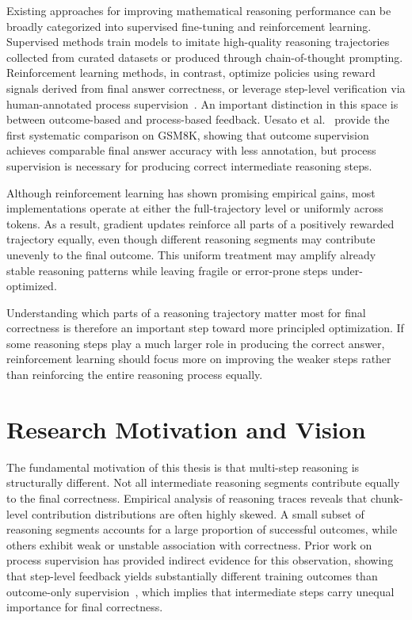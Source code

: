 \documentclass[12pt]{report}
\begin{document}
Existing approaches for improving mathematical reasoning performance can be broadly categorized into supervised fine-tuning and reinforcement learning. 
Supervised methods train models to imitate high-quality reasoning trajectories collected from curated datasets or produced through chain-of-thought prompting. 
Reinforcement learning methods, in contrast, optimize policies using reward signals derived from final answer correctness, or leverage step-level verification via human-annotated process supervision~\cite{lightman2023letsverifystepstep}.
An important distinction in this space is between outcome-based and process-based feedback. Uesato et al.~\cite{uesato2022solvingmathwordproblems} provide the first systematic comparison on GSM8K, showing that outcome supervision achieves comparable final answer accuracy with less annotation, but process supervision is necessary for producing correct intermediate reasoning steps.

Although reinforcement learning has shown promising empirical gains, most implementations operate at either the full-trajectory level or uniformly across tokens. 
As a result, gradient updates reinforce all parts of a positively rewarded trajectory equally, even though different reasoning segments may contribute unevenly to the final outcome. 
This uniform treatment may amplify already stable reasoning patterns while leaving fragile or error-prone steps under-optimized.

Understanding which parts of a reasoning trajectory matter most for final correctness is therefore an important step toward more principled optimization. 
If some reasoning steps play a much larger role in producing the correct answer, reinforcement learning should focus more on improving the weaker steps rather than reinforcing the entire reasoning process equally.

\section{Research Motivation and Vision}
The fundamental motivation of this thesis is that multi-step reasoning is structurally different. 
Not all intermediate reasoning segments contribute equally to the final correctness. 
Empirical analysis of reasoning traces reveals that chunk-level contribution distributions are often highly skewed.
A small subset of reasoning segments accounts for a large proportion of successful outcomes, while others exhibit weak or unstable association with correctness. Prior work on process supervision has provided indirect evidence for this observation, showing that step-level feedback yields substantially different training outcomes than outcome-only supervision~\cite{uesato2022solvingmathwordproblems,lightman2023letsverifystepstep}, which implies that intermediate steps carry unequal importance for final correctness.
\end{document}
